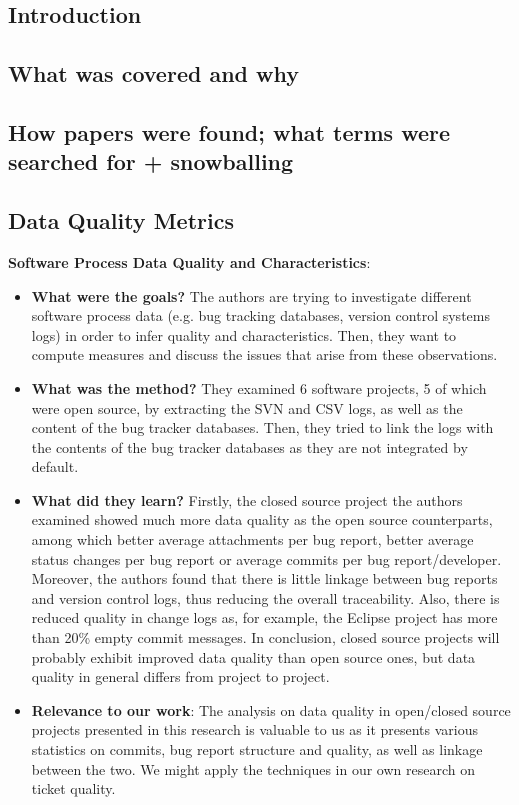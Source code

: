 \documentclass{mprop}
\begin{document}
\subsection{Introduction}

\subsection{What was covered and why}

\subsection{How papers were found; what terms were searched for + snowballing}

\subsection{Data Quality Metrics}

\textbf{Software Process Data Quality and Characteristics}\cite{bachmann2009software}:
\begin{itemize}
  \item \textbf{What were the goals?}
    The authors are trying to investigate different software process data
    (e.g. bug tracking databases, version control systems logs) in order to
    infer quality and characteristics. Then, they want to compute measures
    and discuss the issues that arise from these observations.
  \item \textbf{What was the method?}
    They examined 6 software projects, 5 of which were open source, by extracting
    the SVN and CSV logs, as well as the content of the bug tracker databases. Then,
    they tried to link the logs with the contents of the bug tracker databases as they
    are not integrated by default. 
  \item \textbf{What did they learn?}
    Firstly, the closed source project the authors examined showed much more data
    quality as the open source counterparts, among which better average attachments 
    per bug report, better average status changes per bug report or average commits
    per bug report/developer. Moreover, the authors found that there is little linkage
    between bug reports and version control logs, thus reducing the overall traceability.
    Also, there is reduced quality in change logs as, for example, the Eclipse project
    has more than 20\% empty commit messages. In conclusion, closed source projects will
    probably exhibit improved data quality than open source ones, but data quality in general
    differs from project to project.
  \item \textbf{Relevance to our work}:
    The analysis on data quality in open/closed source projects presented in this 
    research is valuable to us as it presents various statistics on commits, bug report
    structure and quality, as well as linkage between the two. We might apply the techniques
    in our own research on ticket quality.
\end{itemize}
\end{document}
